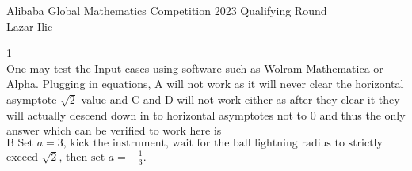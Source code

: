 \Large
Alibaba Global Mathematics Competition 2023 Qualifying Round \\
Lazar Ilic



1 \\
One may test the Input cases using software such as Wolram Mathematica or Alpha. Plugging in equations, A will not work as it will never clear the horizontal asymptote $\sqrt{2}$ value and C and D will not work either as after they clear it they will actually descend down in to horizontal asymptotes not to $0$ and thus the only answer which can be verified to work here is $\boxed{\text{B Set }a=3\text{, kick the instrument, wait for the ball lightning radius to strictly}}$ $\boxed{\text{exceed }\sqrt{2}\text{, then set }a=-\frac{1}{3}}$.


